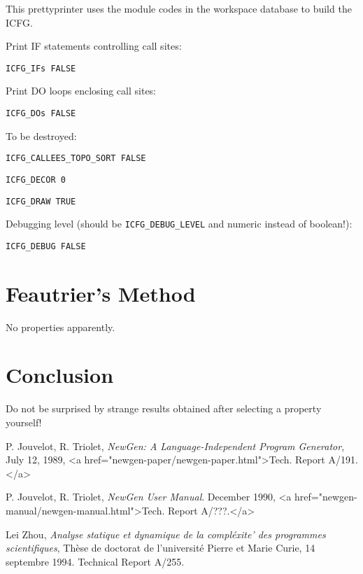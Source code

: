 This prettyprinter uses the module codes in the workspace database to
build the ICFG.

Print IF statements controlling call sites:

\begin{verbatim}
ICFG_IFs FALSE
\end{verbatim}

Print DO loops enclosing call sites:

\begin{verbatim}
ICFG_DOs FALSE
\end{verbatim}

To be destroyed:

\begin{verbatim}
ICFG_CALLEES_TOPO_SORT FALSE
\end{verbatim}

\begin{verbatim}
ICFG_DECOR 0
\end{verbatim}

\begin{verbatim}
ICFG_DRAW TRUE
\end{verbatim}

Debugging level (should be \verb+ICFG_DEBUG_LEVEL+ and numeric instead
of boolean!):

\begin{verbatim}
ICFG_DEBUG FALSE
\end{verbatim}

\section{Feautrier's Method}

No properties apparently.

\section*{Conclusion}

Do not be surprised by strange results obtained after selecting a
property yourself!

\begin{thebibliography}{99}

 P. Jouvelot, R. Triolet, 
{\em NewGen: A Language-Independent Program Generator},
July 12, 1989, 
<a href="newgen-paper/newgen-paper.html">Tech. Report A/191.</a>

 P. Jouvelot, R. Triolet, 
{\em NewGen User Manual}. December
1990, <a href="newgen-manual/newgen-manual.html">Tech. Report A/???.</a>

 Lei Zhou,
{\em Analyse statique et dynamique de la compl\'exite' des programmes
scientifiques}, 
Th\`ese de doctorat de l'universit\'e Pierre et Marie Curie, 14
septembre 1994. Technical Report A/255.

\end{thebibliography}


